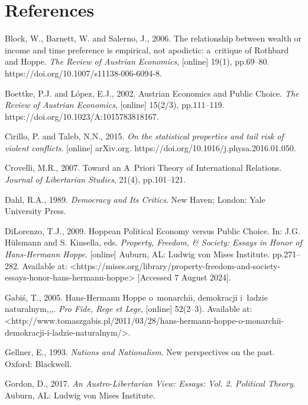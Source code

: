 \section{References}

Block, W., Barnett, W. and Salerno, J., 2006. The relationship between wealth or income and time preference is empirical, not apodictic: a~critique of Rothbard and Hoppe. \textit{The Review of Austrian Economics}, [online] 19(1), pp.69–80. https://doi.org/10.1007/s11138-006-6094-8.



Boettke, P.J. and López, E.J., 2002. Austrian Economics and Public Choice. \textit{The Review of Austrian Economics}, [online] 15(2/3), pp.111–119. https://doi.org/10.1023/A:1015783818167.



Cirillo, P. and Taleb, N.N., 2015. \textit{On the statistical properties and tail risk of violent conflicts}. [online] arXiv.org. https://doi.org/10.1016/j.physa.2016.01.050.



Crovelli, M.R., 2007. Toward an A~Priori Theory of International Relations. \textit{Journal of Libertarian Studies}, 21(4), pp.101–121.



Dahl, R.A., 1989. \textit{Democracy and Its Critics}. New Haven; London: Yale University Press.



DiLorenzo, T.J., 2009. Hoppean Political Economy versus Public Choice. In: J.G. Hülsmann and S. Kinsella, eds. \textit{Property, Freedom, \& Society: Essays in Honor of Hans-Hermann Hoppe}. [online] Auburn, AL: Ludwig von Mises Institute. pp.271–282. Available at: {\textless}https://mises.org/library/property-freedom-and-society-essays-honor-hans-hermann-hoppe{\textgreater} [Accessed 7 August 2024].



Gabiś, T., 2005. Hans-Hermann Hoppe o~monarchii, demokracji i~ładzie naturalnym,,,. \textit{Pro Fide, Rege et Lege}, [online] 52(2–3). Available at: {\textless}http://www.tomaszgabis.pl/2011/03/28/hans-hermann-hoppe-o-monarchii-demokracji-i-ladzie-naturalnym/{\textgreater}.



Gellner, E., 1993. \textit{Nations and Nationalism}. New perspectives on the past. Oxford: Blackwell.



Gordon, D., 2017. \textit{An Austro-Libertarian View: Essays: Vol. 2. Political Theory}. Auburn, AL: Ludwig von Mises Institute.



